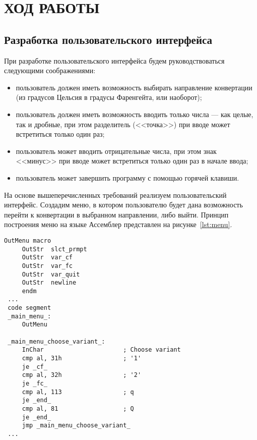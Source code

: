 \section{ХОД РАБОТЫ}

\subsection{Разработка пользовательского интерфейса}

При разработке пользовательского интерфейса будем
руководствоваться следующими соображениями:
\begin{itemize}
    \item пользователь должен иметь возможность выбирать направление
    конвертации (из градусов Цельсия в градусы Фаренгейта, или наоборот);

    \item пользователь должен иметь возможность вводить только числа --- как целые,
      так и дробные, при этом разделитель (<<точка>>) при вводе может встретиться
      только один раз;

    \item пользователь может вводить отрицательные числа,
      при этом знак <<минус>> при вводе может встретиться только один раз в начале ввода;

    \item пользователь может завершить программу с помощью горячей клавиши.
\end{itemize}

На основе вышеперечисленных требований реализуем пользовательский интерфейс.
Создадим меню, в котором пользователю будет дана возможность перейти к конвертации
в выбранном направлении, либо выйти. Принцип построения меню на языке Ассемблер
представлен на рисунке~\ref{lst:menu}.

\begin{lstlisting}[caption=Принцип построения пользователького меню,
label=lst:menu,language={[x86masm]Assembler},basicstyle=\scriptsize\ttfamily]
 OutMenu macro
     OutStr  slct_prmpt
     OutStr  var_cf
     OutStr  var_fc
     OutStr  var_quit
     OutStr  newline
     endm
 ...
 code segment
 _main_menu_:
     OutMenu

 _main_menu_choose_variant_:
     InChar                      ; Choose variant
     cmp al, 31h                 ; '1'
     je _cf_
     cmp al, 32h                 ; '2'
     je _fc_
     cmp al, 113                 ; q
     je _end_
     cmp al, 81                  ; Q
     je _end_
     jmp _main_menu_choose_variant_
 ...
\end{lstlisting}

